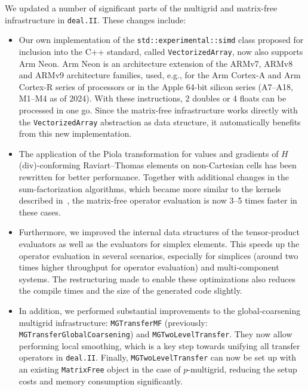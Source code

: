 \documentclass{ansarticle-preprint}
\newcommand{\specialword}[1]{\texttt{#1}}
\newcommand{\dealii}{{\specialword{deal.II}}\xspace}
\begin{document}
We updated a number of significant parts of the multigrid and matrix-free
infrastructure in \dealii. These changes include:
\begin{itemize}
\item Our own implementation of the \texttt{std::experimental::simd}
  class proposed for inclusion into the C++ standard, called
  \texttt{VectorizedArray}, now also supports Arm Neon. Arm Neon is an
  architecture extension of the ARMv7, ARMv8 and ARMv9 architecture families,
  used, e.g., for the Arm Cortex-A and Arm Cortex-R series of processors or in
  the Apple 64-bit silicon series (A7--A18, M1--M4 as of 2024).
  With these instructions, 2 doubles or 4 floats can be processed in one
  go. Since the matrix-free infrastructure works directly with the \texttt{VectorizedArray}
  abstraction as data structure, it automatically benefits from this new implementation.

\item The application of the Piola transformation for values and gradients of
  $H$(div)-conforming Raviart--Thomas elements on non-Cartesian cells has
  been rewritten for better performance. Together with additional changes in
  the sum-factorization algorithms, which became more similar to the kernels
  described in~\cite{KronbichlerKormann2019}, the matrix-free operator
  evaluation is now 3--5 times faster in these cases.

\item Furthermore, we improved the internal data structures of the tensor-product
  evaluators as well as the evaluators for simplex elements.  This speeds up
  the operator evaluation in several scenarios, especially for simplices
  (around two times higher throughput for operator evaluation) and
  multi-component systems. The restructuring made to enable these optimizations
  also reduces the compile times and the size of the generated code slightly.

\item In addition, we performed substantial improvements to the global-coarsening
  multigrid infrastructure: \texttt{MGTransferMF} (previously:
  \texttt{MGTransferGlobalCoarsening}) and \texttt{MGTwoLevel\-Transfer}. They
  now allow performing local smoothing, which is a key step towards unifying
  all transfer operators in \dealii. Finally, \texttt{MGTwoLevelTransfer} can now
  be set up with an existing \texttt{MatrixFree} object in the case
  of $p$-multigrid, reducing the setup costs and memory consumption significantly.
\end{itemize}
\end{document}

